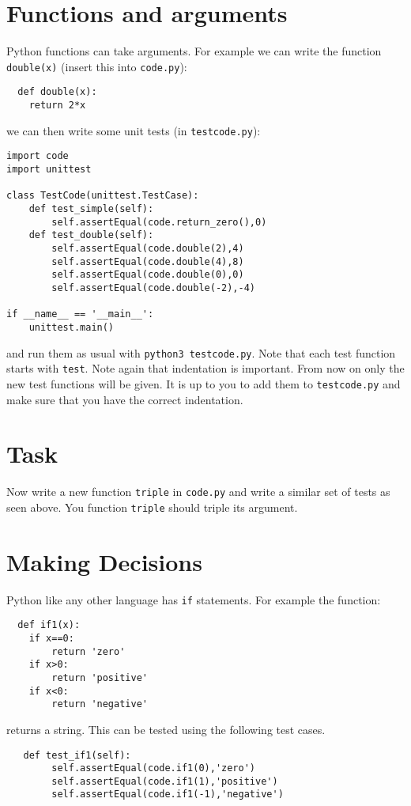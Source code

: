 \documentclass{paper}
\begin{document}
\section*{Functions and arguments}
Python functions can take arguments. For example we can write the
function {\tt double(x)} (insert this into {\tt code.py}):
\begin{lstlisting}
  def double(x):
    return 2*x
\end{lstlisting}
we can then write some unit tests (in {\tt testcode.py}):
\begin{lstlisting}
import code
import unittest

class TestCode(unittest.TestCase):
    def test_simple(self):
        self.assertEqual(code.return_zero(),0)
    def test_double(self):
        self.assertEqual(code.double(2),4)
        self.assertEqual(code.double(4),8)
        self.assertEqual(code.double(0),0)
        self.assertEqual(code.double(-2),-4)

if __name__ == '__main__':
    unittest.main()

\end{lstlisting} and run them as usual with {\tt python3 testcode.py}. Note that each test function starts
with {\tt test}. Note again that indentation is important. From now on only
the new test functions will be given. It is up to you to add them to
{\tt testcode.py} and make sure that you have the correct indentation.

\section{Task}
Now write a new function {\tt triple} in {\tt code.py} and write a
similar set of tests as seen above. You function {\tt triple} should triple
its argument.

\section*{Making Decisions}
Python like any other language has {\tt if} statements. For example
the function:
\begin{lstlisting}
  def if1(x):
    if x==0:
        return 'zero'
    if x>0:
        return 'positive'
    if x<0:
        return 'negative'
\end{lstlisting}
returns a string. This can be tested using the following test cases.
\begin{lstlisting}
   def test_if1(self):
        self.assertEqual(code.if1(0),'zero')
        self.assertEqual(code.if1(1),'positive')
        self.assertEqual(code.if1(-1),'negative')
\end{lstlisting}
\end{document}
